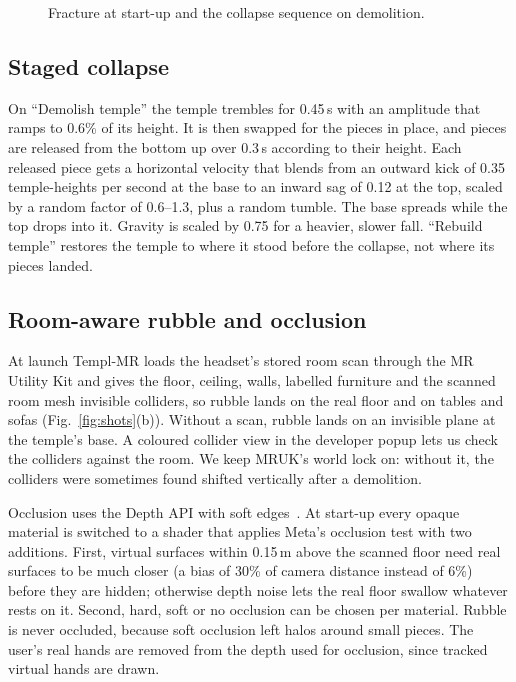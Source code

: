 \documentclass[conference]{IEEEtran}
\begin{document}
\begin{figure}[t]
\centering
\resizebox{\columnwidth}{!}{}
\caption{Fracture at start-up and the collapse sequence on demolition.}
\label{fig:fracture}
\end{figure}

\subsection{Staged collapse}
On ``Demolish temple'' the temple trembles for 0.45\,s with an amplitude that ramps to 0.6\% of its height. It is then swapped for the pieces in place, and pieces are released from the bottom up over 0.3\,s according to their height. Each released piece gets a horizontal velocity that blends from an outward kick of 0.35 temple-heights per second at the base to an inward sag of 0.12 at the top, scaled by a random factor of 0.6--1.3, plus a random tumble. The base spreads while the top drops into it. Gravity is scaled by 0.75 for a heavier, slower fall. ``Rebuild temple'' restores the temple to where it stood before the collapse, not where its pieces landed.

\subsection{Room-aware rubble and occlusion}
At launch Templ-MR loads the headset's stored room scan through the MR Utility Kit and gives the floor, ceiling, walls, labelled furniture and the scanned room mesh invisible colliders, so rubble lands on the real floor and on tables and sofas (Fig.~\ref{fig:shots}(b)). Without a scan, rubble lands on an invisible plane at the temple's base. A coloured collider view in the developer popup lets us check the colliders against the room. We keep MRUK's world lock on: without it, the colliders were sometimes found shifted vertically after a demolition.

Occlusion uses the Depth API with soft edges~\cite{metadepth}. At start-up every opaque material is switched to a shader that applies Meta's occlusion test with two additions. First, virtual surfaces within 0.15\,m above the scanned floor need real surfaces to be much closer (a bias of 30\% of camera distance instead of 6\%) before they are hidden; otherwise depth noise lets the real floor swallow whatever rests on it. Second, hard, soft or no occlusion can be chosen per material. Rubble is never occluded, because soft occlusion left halos around small pieces. The user's real hands are removed from the depth used for occlusion, since tracked virtual hands are drawn.
\end{document}
